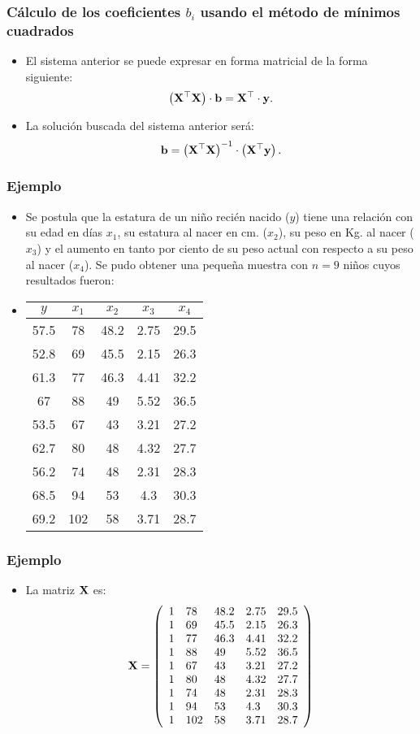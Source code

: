 \begin{frame}
\frametitle{Cálculo de los coeficientes $b_i$ usando el método de mínimos cuadrados}
\begin{itemize}
\item<2->{El sistema anterior se puede expresar en forma matricial de la forma siguiente: 
$$
\left(\mathbf{X}^\top\mathbf{X}\right)\cdot \mathbf{b}=\mathbf{X}^\top\cdot \mathbf{y}.
$$}
\item<3->{La solución buscada del sistema anterior será:
$$
\mathbf{b}=\left(\mathbf{X}^\top\mathbf{X}\right)^{-1}\cdot \left(\mathbf{X}^\top \mathbf{y}\right).
$$}
\end{itemize}

\end{frame}
\begin{frame}
\frametitle{Ejemplo}
\begin{itemize}
\item<2->{Se postula que la estatura de un niño recién nacido ($y$)  tiene
una relación con su edad en días $x_1$, su estatura al nacer en
cm. ($x_2$), su peso en Kg. al nacer ($x_3$) y el aumento en tanto por ciento de su peso actual con respecto a su peso al nacer ($x_4$). Se pudo obtener una pequeña muestra con $n=9$
niños cuyos resultados fueron:}
\item<3->{\begin{center}\begin{tabular}{|c|c|c|c|c|}\hline
$y$ & $x_1$ & $x_2$ & $x_3$ & $x_4$\\\hline
57.5&78&48.2&2.75&29.5\\ 52.8&69&45.5&2.15&26.3\\
61.3&77&46.3&4.41&32.2\\ 67&88&49&5.52&36.5\\ 53.5&67&43&3.21&27.2\\
62.7&80&48&4.32&27.7\\ 56.2&74&48&2.31&28.3\\ 68.5&94&53&4.3&30.3\\
69.2&102&58&3.71&28.7\\\hline\end{tabular}\end{center}}
\end{itemize}
\end{frame}
\begin{frame}
\frametitle{Ejemplo}
\begin{itemize}
\item<2->{La matriz $\mathbf{X}$ es:
$$
\mathbf{X}=\left(
\begin{array}{lllll}
1&78&48.2&2.75&29.5\\
1&69&45.5&2.15&26.3\\
1&77&46.3&4.41&32.2\\
1&88&49&5.52&36.5\\
1&67&43&3.21&27.2\\
1&80&48&4.32&27.7\\
1&74&48&2.31&28.3\\
1&94&53&4.3&30.3\\
1&102&58&3.71&28.7
\end{array}
\right)
$$}
\end{itemize}
\end{frame}
